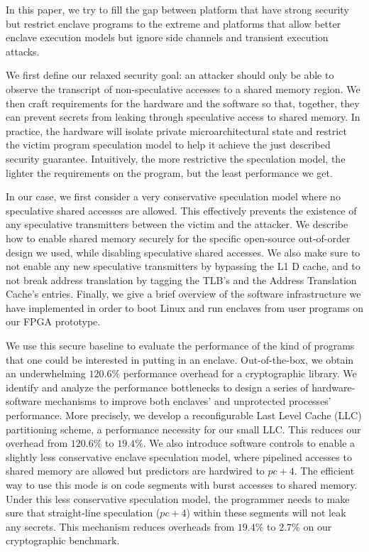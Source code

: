 In this paper, we try to fill the gap between platform that have strong security but restrict enclave programs to the extreme and platforms that allow better enclave execution models but ignore side channels and transient execution attacks.

We first define our relaxed security goal: an attacker should only be able to observe the transcript of non-speculative accesses to a shared memory region.
We then craft requirements for the hardware and the software so that, together, they can prevent secrets from leaking through speculative access to shared memory.
In practice, the hardware will isolate private microarchitectural state and restrict the victim program speculation model to help it achieve the just described security guarantee.
Intuitively, the more restrictive the speculation model, the lighter the requirements on the program, but the least performance we get.

In our case, we first consider a very conservative speculation model where no speculative shared accesses are allowed.
This effectively prevents the existence of any speculative transmitters between the victim and the attacker.
We describe how to enable shared memory securely for the specific open-source out-of-order design we used, while disabling speculative shared accesses.
We also make sure to not enable any new speculative transmitters by bypassing the L1 D cache, and to not break address translation by tagging the TLB's and the Address Translation Cache's entries.
Finally, we give a brief overview of the software infrastructure we have implemented in order to boot Linux and run enclaves from user programs on our FPGA prototype.

We use this secure baseline to evaluate the performance of the kind of programs that one could be interested in putting in an enclave.
Out-of-the-box, we obtain an underwhelming $120.6\%$ performance overhead for a cryptographic library.
We identify and analyze the performance bottlenecks to design a series of hardware-software mechanisms to improve both enclaves' and unprotected processes' performance.
More precisely, we develop a reconfigurable Last Level Cache (LLC) partitioning scheme, a performance necessity for our small LLC.
This reduces our overhead from $120.6\%$ to $19.4\%$.
We also introduce software controls to enable a slightly less conservative enclave speculation model, where pipelined accesses to shared memory are allowed but predictors are hardwired to $pc + 4$.
The efficient way to use this mode is on code segments with burst accesses to shared memory.
Under this less conservative speculation model, the programmer needs to make sure that straight-line speculation ($pc+4$) within these segments will not leak any secrets.
This mechanism reduces overheads from $19.4\%$ to $2.7\%$ on our cryptographic benchmark.


